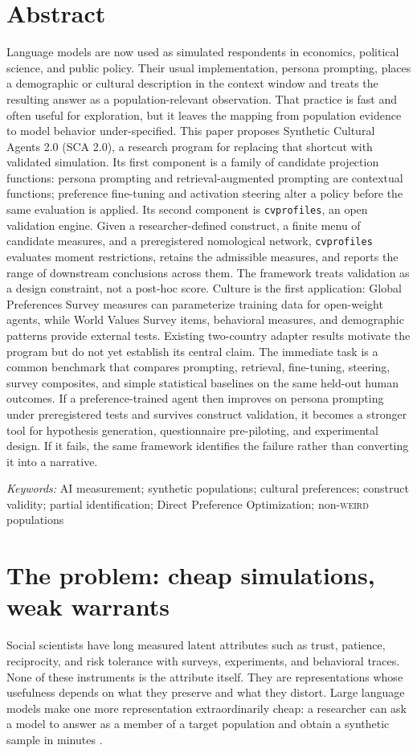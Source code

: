 \documentclass[10pt,letterpaper]{article}
\newcommand{\WEIRD}{\textsc{weird}}
\newcommand{\cvp}{\texttt{cvprofiles}}
\begin{document}
\section*{Abstract}
Language models are now used as simulated respondents in economics, political science, and public policy. Their usual implementation, persona prompting, places a demographic or cultural description in the context window and treats the resulting answer as a population-relevant observation. That practice is fast and often useful for exploration, but it leaves the mapping from population evidence to model behavior under-specified. This paper proposes Synthetic Cultural Agents 2.0 (SCA 2.0), a research program for replacing that shortcut with validated simulation. Its first component is a family of candidate projection functions: persona prompting and retrieval-augmented prompting are contextual functions; preference fine-tuning and activation steering alter a policy before the same evaluation is applied. Its second component is \cvp{}, an open validation engine. Given a researcher-defined construct, a finite menu of candidate measures, and a preregistered nomological network, \cvp{} evaluates moment restrictions, retains the admissible measures, and reports the range of downstream conclusions across them. The framework treats validation as a design constraint, not a post-hoc score. Culture is the first application: Global Preferences Survey measures can parameterize training data for open-weight agents, while World Values Survey items, behavioral measures, and demographic patterns provide external tests. Existing two-country adapter results motivate the program but do not yet establish its central claim. The immediate task is a common benchmark that compares prompting, retrieval, fine-tuning, steering, survey composites, and simple statistical baselines on the same held-out human outcomes. If a preference-trained agent then improves on persona prompting under preregistered tests and survives construct validation, it becomes a stronger tool for hypothesis generation, questionnaire pre-piloting, and experimental design. If it fails, the same framework identifies the failure rather than converting it into a narrative.

\noindent\textit{Keywords:} AI measurement; synthetic populations; cultural preferences; construct validity; partial identification; Direct Preference Optimization; non-\WEIRD{} populations

\section{The problem: cheap simulations, weak warrants}
Social scientists have long measured latent attributes such as trust, patience, reciprocity, and risk tolerance with surveys, experiments, and behavioral traces. None of these instruments is the attribute itself. They are representations whose usefulness depends on what they preserve and what they distort. Large language models make one more representation extraordinarily cheap: a researcher can ask a model to answer as a member of a target population and obtain a synthetic sample in minutes \cite{horton2023,argyle2023,aher2023}.
\end{document}

